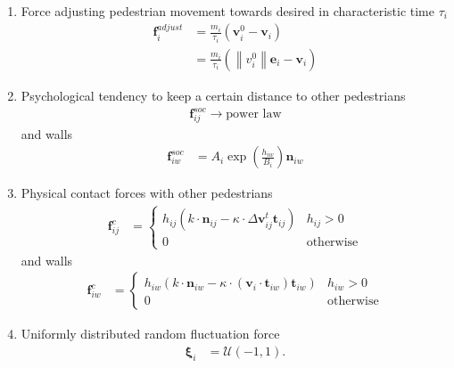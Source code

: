 \begin{enumerate}[label=\roman{enumi})]
\item 
Force adjusting pedestrian movement towards desired in characteristic time $ \tau_{i} $
\begin{align}
\mathbf{f}_{i}^{adjust} &= \frac{m_{i}}{\tau_{i}} (\mathbf{v}_{i}^{0} - \mathbf{v}_{i}) \\
&=  \frac{m_{i}}{\tau_{i}} (\left\|v_{i}^{0}\right\| \mathbf{e}_{i} - \mathbf{v}_{i})
\end{align}


\item 
Psychological tendency to keep a certain distance to other pedestrians
\begin{align}
\mathbf{f}_{ij}^{soc} \to \text{power law}
\end{align}
and walls
\begin{align}
\mathbf{f}_{iw}^{soc} &= A_{i} \exp\left(\frac{h_{iw}}{B_{i}}\right) \mathbf{n}_{iw}
\end{align} 


\item 
Physical contact forces with other pedestrians 
\begin{align}
\mathbf{f}_{ij}^{c} &= 
\begin{cases}
h_{ij} \left(k \cdot \mathbf{n}_{ij} - \kappa \cdot \Delta \mathbf{v}_{ij}^{t} \mathbf{t}_{ij}\right) & h_{ij} > 0 \\
0 & \text{otherwise}
\end{cases}
\end{align}
and walls
\begin{align}
\mathbf{f}_{iw}^{c} &= 
\begin{cases}
h_{iw} \left(k \cdot \mathbf{n}_{iw} - \kappa \cdot (\mathbf{v}_{i} \cdot \mathbf{t}_{iw}) \mathbf{t}_{iw}\right) & h_{iw} > 0 \\
0 & \text{otherwise}
\end{cases}
\end{align}


\item 
Uniformly distributed random fluctuation force
\begin{align}
\boldsymbol{\xi}_{i} &= \boldsymbol{\mathcal{U}}(-1, 1).
\end{align}


\end{enumerate}


